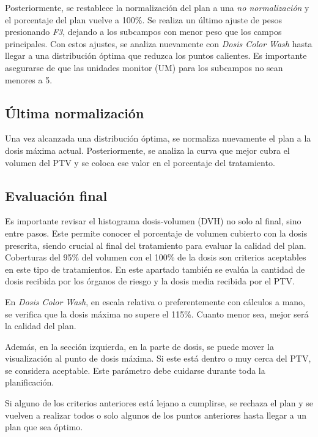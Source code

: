 \documentclass{article}
\begin{document}
Posteriormente, se restablece la normalización del plan a una \textit{no normalización} y el porcentaje del plan vuelve a 100\%. Se realiza un último ajuste de pesos presionando \textit{F3}, dejando a los subcampos con menor peso que los campos principales. Con estos ajustes, se analiza nuevamente con \textit{Dosis Color Wash} hasta llegar a una distribución óptima que reduzca los puntos calientes. Es importante asegurarse de que las unidades monitor (UM) para los subcampos no sean menores a 5.

\subsection*{Última normalización}

Una vez alcanzada una distribución óptima, se normaliza nuevamente el plan a la dosis máxima actual. Posteriormente, se analiza la curva que mejor cubra el volumen del PTV y se coloca ese valor en el porcentaje del tratamiento.

\subsection*{Evaluación final}

Es importante revisar el histograma dosis-volumen (DVH) no solo al final, sino entre pasos. Este permite conocer el porcentaje de volumen cubierto con la dosis prescrita, siendo crucial al final del tratamiento para evaluar la calidad del plan. Coberturas del 95\% del volumen con el 100\% de la dosis son criterios aceptables en este tipo de tratamientos. En este apartado también se evalúa la cantidad de dosis recibida por los órganos de riesgo y la dosis media recibida por el PTV.

En \textit{Dosis Color Wash}, en escala relativa o preferentemente con cálculos a mano, se verifica que la dosis máxima no supere el 115\%. Cuanto menor sea, mejor será la calidad del plan.

Además, en la sección izquierda, en la parte de dosis, se puede mover la visualización al punto de dosis máxima. Si este está dentro o muy cerca del PTV, se considera aceptable. Este parámetro debe cuidarse durante toda la planificación.

Si alguno de los criterios anteriores está lejano a cumplirse, se rechaza el plan y se vuelven a realizar todos o solo algunos de los puntos anteriores hasta llegar a un plan que sea óptimo.


\vspace{3pt}
\end{document}
